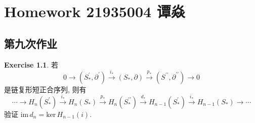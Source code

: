 \documentclass[a4paper]{book}
\makeatletter
\newcommand{\voidenvironment}[1]{%
  \expandafter\providecommand\csname env@#1@save@env\endcsname{}%
  \expandafter\providecommand\csname env@#1@process\endcsname{}%
  \@ifundefined{#1}{}{\RenewEnviron{#1}{}}%
}
\numberwithin{equation}{chapter}
\theoremstyle{definition}
\newtheorem{exc}[exm]{Exercise}
\makeatother
\begin{document}
\pagestyle{empty}
%



\setcounter{chapter}{4}




\chapter{Homework 21935004 谭焱}



\section{第九次作业}

\begin{exc}
	若
	\[0 \rightarrow (S^\prime_*, \partial^\prime) \overset{i_*}{\rightarrow} (S_*, \partial) \overset{p_*}{\rightarrow} (S^{\prime \prime}, \partial^{\prime \prime}) \rightarrow 0\]
	是链复形短正合序列, 则有
	\[\cdots \rightarrow H_n(S^\prime_*) \overset{i_*}{\rightarrow} H_n(S_*) \overset{p_*}{\rightarrow} H_n(S^{\prime \prime}_*) \overset{d_*}{\rightarrow} H_{n-1}(S^\prime_*) \overset{i_*}{\rightarrow} H_{n-1}(S_*) \rightarrow \cdots\]
	验证 $ \text{im}\, d_n = \text{ker}\, H_{n-1}(i) $.
\end{exc} 
\end{document}
